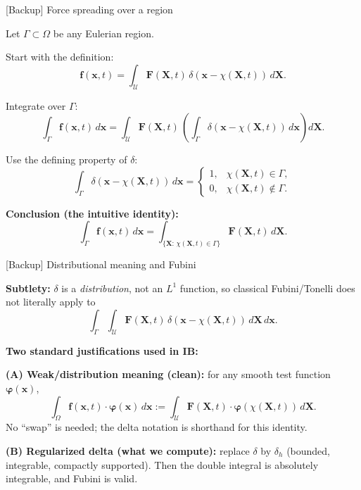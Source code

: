 \documentclass[aspectratio=169,11pt]{beamer}
\begin{document}
\begin{frame}{[Backup] Force spreading over a region}
\footnotesize

Let $\Gamma\subset\Omega$ be any Eulerian region.

\medskip
Start with the definition:
\[
\mathbf{f}(\mathbf{x},t)=\int_{\mathcal U}\mathbf{F}(\mathbf{X},t)\,
\delta(\mathbf{x}-\chi(\mathbf{X},t))\,d\mathbf{X}.
\]

\medskip
Integrate over $\Gamma$:
\[
\int_{\Gamma}\mathbf{f}(\mathbf{x},t)\,d\mathbf{x}
=
\int_{\mathcal U}\mathbf{F}(\mathbf{X},t)\,
\left(\int_{\Gamma}\delta(\mathbf{x}-\chi(\mathbf{X},t))\,d\mathbf{x}\right)d\mathbf{X}.
\]

\medskip
Use the defining property of $\delta$:
\[
\int_{\Gamma}\delta(\mathbf{x}-\chi(\mathbf{X},t))\,d\mathbf{x}
=
\begin{cases}
1, & \chi(\mathbf{X},t)\in\Gamma,\\
0, & \chi(\mathbf{X},t)\notin\Gamma.
\end{cases}
\]

\medskip
\textbf{Conclusion (the intuitive identity):}
\[
\boxed{
\int_{\Gamma}\mathbf{f}(\mathbf{x},t)\,d\mathbf{x}
=
\int_{\{\mathbf{X}:\,\chi(\mathbf{X},t)\in\Gamma\}}\mathbf{F}(\mathbf{X},t)\,d\mathbf{X}.
}
\]

\end{frame}

\begin{frame}{[Backup] Distributional meaning and Fubini}
\small

\textbf{Subtlety:} $\delta$ is a \emph{distribution}, not an $L^1$ function, so classical Fubini/Tonelli
does not literally apply to
\[
\int_{\Gamma}\int_{\mathcal U}\mathbf{F}(\mathbf{X},t)\,\delta(\mathbf{x}-\chi(\mathbf{X},t))\,d\mathbf{X}\,d\mathbf{x}.
\]

\medskip
\textbf{Two standard justifications used in IB:}

\medskip
\textbf{(A) Weak/distribution meaning (clean):}
for any smooth test function $\boldsymbol{\varphi}(\mathbf{x})$,
\[
\int_{\Omega}\mathbf{f}(\mathbf{x},t)\cdot\boldsymbol{\varphi}(\mathbf{x})\,d\mathbf{x}
:=
\int_{\mathcal U}\mathbf{F}(\mathbf{X},t)\cdot\boldsymbol{\varphi}(\chi(\mathbf{X},t))\,d\mathbf{X}.
\]
No ``swap'' is needed; the delta notation is shorthand for this identity.

\medskip
\textbf{(B) Regularized delta (what we compute):}
replace $\delta$ by $\delta_h$ (bounded, integrable, compactly supported). Then the double integral is absolutely integrable,
and Fubini is valid.

\end{frame}
\end{document}
